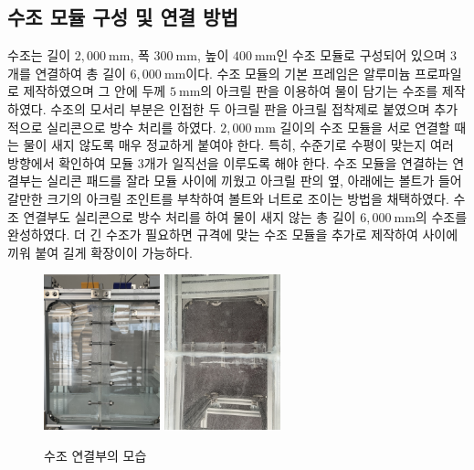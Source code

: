 \subsection{수조 모듈 구성 및 연결 방법}
수조는 길이 $2,000~\mathrm{mm}$, 폭 $300~\mathrm{mm}$, 높이 $400~\mathrm{mm}$인 수조 모듈로 구성되어 있으며 3개를 연결하여 총 길이 $6,000~\mathrm{mm}$이다. 수조 모듈의 기본 프레임은 알루미늄 프로파일로 제작하였으며 그 안에 두께 $5~\mathrm{mm}$의 아크릴 판을 이용하여 물이 담기는 수조를 제작하였다. 수조의 모서리 부분은 인접한 두 아크릴 판을 아크릴 접착제로 붙였으며 추가적으로 실리콘으로 방수 처리를 하였다. $2,000~\mathrm{mm}$ 길이의 수조 모듈을 서로 연결할 때는 물이 새지 않도록 매우 정교하게 붙여야 한다. 특히, 수준기로 수평이 맞는지 여러 방향에서 확인하여 모듈 3개가 일직선을 이루도록 해야 한다. 수조 모듈을 연결하는 연결부는 실리콘 패드를 잘라 모듈 사이에 끼웠고 아크릴 판의 옆, 아래에는 볼트가 들어갈만한 크기의 아크릴 조인트를 부착하여 볼트와 너트로 조이는 방법을 채택하였다. 수조 연결부도 실리콘으로 방수 처리를 하여 물이 새지 않는 총 길이 $6,000~\mathrm{mm}$의 수조를 완성하였다. 더 긴 수조가 필요하면 규격에 맞는 수조 모듈을 추가로 제작하여 사이에 끼워 붙여 길게 확장이이 가능하다.

\begin{figure}[h]
	\begin{center}
		\includegraphics[width=0.3\textwidth]{images/magam1.jpg}
		\includegraphics[width=0.3\textwidth]{images/magam2.jpg}
		\caption{수조 연결부의 모습}
		\label{Waveabsorber}
	\end{center}
\end{figure}

